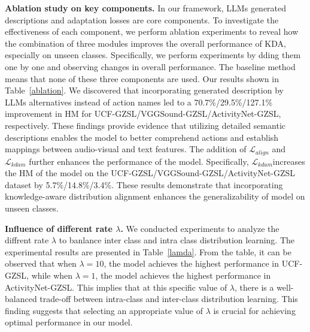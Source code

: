 \documentclass[10pt,twocolumn,letterpaper]{article}
\begin{document}
\noindent
\textbf{Ablation study on key components.}
In our framework, LLMs generated descriptions and adaptation losses are core components. 
To investigate the effectiveness of each component, we perform ablation experiments to reveal how the combination of three modules improves the overall performance of KDA, especially on unseen classes.
Specifically, we perform experiments by dding them one by one and observing changes in overall performance.
The baseline method means that none of these three components are used.
Our results shown in Table~\ref{ablation}.
We discovered that incorporating generated description by LLMs alternatives instead of action names led to a 70.7\%/29.5\%/127.1\% improvement in HM for UCF-GZSL/VGGSound-GZSL/ActivityNet-GZSL, respectively. These findings provide evidence that utilizing detailed semantic descriptions enables the model to better comprehend actions and establish mappings between audio-visual and text features.
The addition of $\mathcal{L}_{align}$ and $\mathcal{L}_{kdam}$ further enhances the performance of the model. 
Specifically, $\mathcal{L}_{kdam}$increases the HM of the model on the UCF-GZSL/VGGSound-GZSL/ActivityNet-GZSL dataset by 5.7\%/14.8\%/3.4\%.
These results demonstrate that incorporating knowledge-aware distribution alignment enhances the generalizability of model on unseen classes.


\noindent
\textbf{Influence of different rate $\lambda$.}
We conducted experiments to analyze the 
diffrent rate $\lambda$ to banlance inter class and intra class distribution learning.
The experimental results are presented in Table~\ref{lamda}. 
From the table, it can be observed that when $\lambda=10$, the model achieves the highest performance in UCF-GZSL, while when $\lambda=1$, the model achieves the highest performance in ActivityNet-GZSL.
This implies that at this specific value of $\lambda$, there is a well-balanced trade-off between intra-class and inter-class distribution learning. This finding suggests that selecting an appropriate value of $\lambda$ is crucial for achieving optimal performance in our model.
\end{document}
